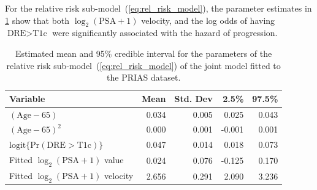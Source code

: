 For the relative risk sub-model~(\ref{eq:rel_risk_model}), the parameter estimates in \ref{tab:DRE_PSA_survival} show that both ${\log_2 (\mbox{PSA} + 1)}$ velocity, and the log odds of having ${\mbox{DRE} > \mbox{T1c}}$  were significantly associated with the hazard of progression.  
\begin{table}[!htb]
\begin{center}
\caption{Estimated mean and 95\% credible interval for the parameters of the relative risk sub-model~(\ref{eq:rel_risk_model}) of the joint model fitted to the PRIAS dataset.}
\label{tab:DRE_PSA_survival}
\begin{tabular}{lrrrr}
\hline
\hline
Variable                      & Mean   & Std. Dev & 2.5\%  & 97.5\% \\
\hline
$(\mbox{Age} - 65)$  & 0.034 & 0.005 & 0.025 & 0.043 \\
$(\mbox{Age} - 65)^2$ & 0.000 & 0.001 & -0.001 & 0.001 \\
$\mbox{logit} \big\{\mbox{Pr}(\mbox{DRE} > \mbox{T1c})\big\}$ & 0.047 & 0.014 & 0.018 & 0.073 \\
Fitted $\log_2 (\mbox{PSA} + 1)$ value  & 0.024 & 0.076 & -0.125 & 0.170\\
Fitted $\log_2 (\mbox{PSA} + 1)$ velocity  & 2.656 & 0.291 & 2.090 & 3.236 \\
\hline
\end{tabular}
\end{center}
\end{table}

